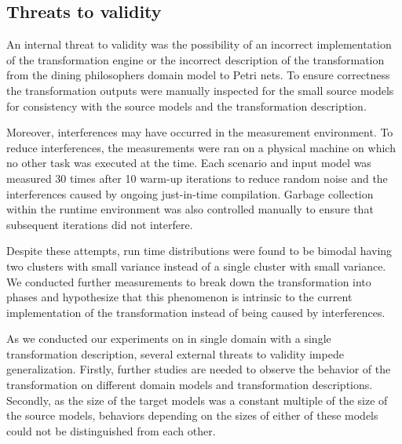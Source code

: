 \subsection{Threats to validity}

An internal threat to validity was the possibility of an incorrect implementation of the transformation engine or the incorrect description of the transformation from the dining philosophers domain model to Petri nets. To ensure correctness the transformation outputs were manually inspected for the small source models for consistency with the source models and the transformation description.

Moreover, interferences may have occurred in the measurement environment. To reduce interferences, the measurements were ran on a physical machine on which no other task was executed at the time. Each scenario and input model was measured 30 times after 10 warm-up iterations to reduce random noise and the interferences caused by ongoing just-in-time compilation. Garbage collection within the runtime environment was also controlled manually to ensure that subsequent iterations did not interfere.

Despite these attempts, run time distributions were found to be bimodal having two clusters with small variance instead of a single cluster with small variance. We conducted further measurements to break down the transformation into phases and hypothesize that this phenomenon is intrinsic to the current implementation of the transformation instead of being caused by interferences.

As we conducted our experiments on in single domain with a single transformation description, several external threats to validity impede generalization. Firstly, further studies are needed to observe the behavior of the transformation on different domain models and transformation descriptions. Secondly, as the size of the target  models was a constant multiple of the size of the source models, behaviors depending on the sizes of either of these models could not be distinguished from each other.
